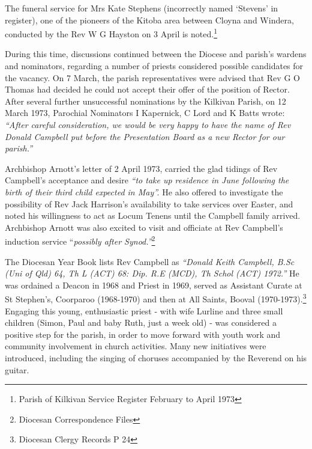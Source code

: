 The funeral service for Mrs Kate Stephens (incorrectly named `Stevens' in register), one of the pioneers of the Kitoba area between Cloyna and Windera, conducted by the Rev W G Hayston on 3 April is noted.\footnote{Parish of Kilkivan Service Register February to April 1973}


During this time, discussions continued between the Diocese and parish's wardens and nominators, regarding a number of priests considered possible candidates for the vacancy. On 7 March, the parish representatives were advised that Rev G O Thomas had decided he could not accept their offer of the position of Rector. After several further unsuccessful nominations by the Kilkivan Parish, on 12 March 1973, Parochial Nominators I Kapernick, C Lord and K Batts wrote: \emph{``After careful consideration, we would be very happy to have the name of Rev Donald Campbell put before the Presentation Board as a new Rector for our parish.''}



Archbishop Arnott's letter of 2 April 1973, carried the glad tidings of Rev Campbell's acceptance and desire \emph{``to take up residence in June following the birth of their third child expected in May''.} He also offered to investigate the possibility of Rev Jack Harrison's availability to take services over Easter, and noted his willingness to act as Locum Tenens until the Campbell family arrived. Archbishop Arnott was also excited to visit and officiate at Rev Campbell's induction service ``\emph{possibly after Synod.''}\footnote{Diocesan Correspondence Files}


The Diocesan Year Book lists Rev Campbell as \emph{``Donald Keith Campbell, B.Sc (Uni of Qld) 64, Th L (ACT) 68: Dip. R.E (MCD), Th Schol (ACT) 1972.''} He was ordained a Deacon in 1968 and Priest in 1969, served as Assistant Curate at St Stephen's, Coorparoo (1968-1970) and then at All Saints, Booval (1970-1973).\footnote{Diocesan Clergy Records P 24} Engaging this young, enthusiastic priest - with wife Lurline and three small children (Simon, Paul and baby Ruth, just a week old) - was considered a positive step for the parish, in order to move forward with youth work and community involvement in church activities. Many new initiatives were introduced, including the singing of choruses accompanied by the Reverend on his guitar.


